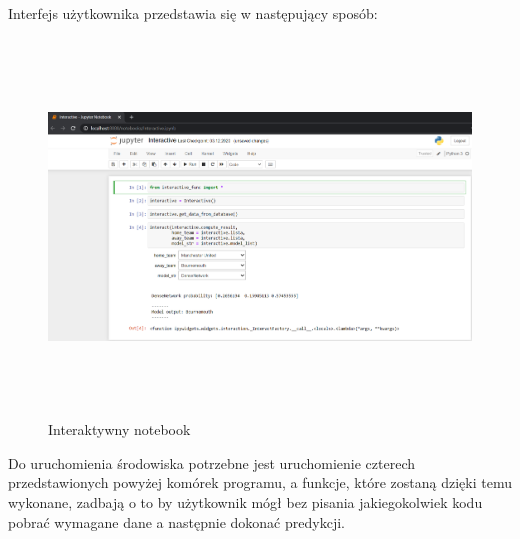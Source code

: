Interfejs użytkownika przedstawia się w następujący sposób:
\begin{figure}[H] 
        \centering\includegraphics[width=16cm,height=10cm]{figures/Interactive_overview.png}
        \caption{Interaktywny notebook}\label{interactive}
\end{figure}
Do uruchomienia środowiska potrzebne jest uruchomienie czterech przedstawionych powyżej komórek programu, a funkcje, które zostaną dzięki temu wykonane, zadbają o to by użytkownik mógł bez pisania jakiegokolwiek kodu pobrać wymagane dane a następnie dokonać predykcji.

